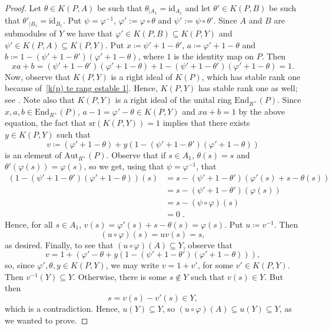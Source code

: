 \documentclass[11pt]{amsart}
\numberwithin{equation}{section}
\theoremstyle{definition}
\theoremstyle{plain}
\theoremstyle{definition}
\begin{document}
\begin{proof}
Let $\theta \in K(P, A)$ be such that $\theta_{|A_1} = \mathrm{id}_{A_1}$ and let $\theta' \in K(P, B)$ be such that $\theta'_{|B_1} = \mathrm{id}_{B_1}$. Put $\psi = \varphi^{-1}$, $\varphi' := \varphi \circ \theta$ and $\psi' := \psi \circ \theta'$. Since $A$ and $B$ are submodules of $Y$ we have that $\varphi' \in K(P, B) \subseteq K(P,Y)$ and $\psi' \in K(P, A) \subseteq K(P,Y)$. Put $x \coloneqq \psi' + 1 - \theta'$, $a \coloneqq \varphi' + 1 - \theta$ and $b \coloneqq 1 - (\psi' + 1 - \theta')(\varphi' + 1 - \theta)$, where $1$ is the identity map on $P$. Then   
\begin{equation*}
    xa + b = (\psi' + 1 - \theta')(\varphi' + 1 - \theta) + 1 - (\psi' + 1 - \theta')(\varphi' + 1 - \theta) = 1.
\end{equation*}
Now, observe that $K(P, Y)$ is a right ideal of $K(P)$, which has stable rank one because of~\autoref{k(p) te rang estable 1}. Hence, $K(P, Y)$ has stable rank one as well; see \cite[Theorem 3.6]{Vaserstein84StRangeCond}. 
Note also that $K(P,Y)$ is a right ideal of the unital ring $\mathrm{End}_{R^+}(P)$.
Since $x, a, b \in \mathrm{End}_{R^+}(P)$, $a - 1 = \varphi' - \theta \in K(P, Y)$ and $xa + b = 1$ by the above equation, the fact that $\mathrm{sr}(K(P, Y)) = 1$ implies that there exists $y \in K(P, Y)$ such that 
\begin{equation*}
    v \coloneqq (\varphi' + 1 - \theta) + y(1 - (\psi' + 1 - \theta')(\varphi' + 1 - \theta)) 
\end{equation*}
is an element of $\mathrm{Aut}_{R^+}(P)$. Observe that if $s \in A_1$, $\theta(s) = s$ and $\theta'(\varphi(s)) = \varphi(s)$, so we get, using that $\psi=\varphi^{-1}$, that
\begin{align*}
    (1 - (\psi' + 1 - \theta')(\varphi' + 1 - \theta))(s) & = s - (\psi' + 1 - \theta')(\varphi'(s) + s - \theta(s)) \\
    & = s - (\psi' + 1 - \theta')(\varphi(s)) \\
    & = s - (\psi \circ \varphi)(s) \\
    & = 0\; . 
\end{align*}
Hence, for all $s \in A_1$, $v(s) =\varphi'(s) + s - \theta(s) = \varphi(s)$. Put $u \coloneqq v^{-1}$. Then 
\begin{equation*}
    (u \circ \varphi)(s) = uv(s) = s,
\end{equation*}
as desired. Finally, to see that $(u \circ \varphi)(A) \subseteq Y$, observe that 
\begin{equation*}
    v = 1 + (\varphi' - \theta + y(1 - (\psi' + 1 - \theta')(\varphi' + 1 - \theta))),
\end{equation*}
so, since $\varphi', \theta, y \in K(P,Y)$, we may write $v = 1 + v'$, for some $v' \in K(P, Y)$. Then $v^{-1}(Y) \subseteq Y$. Otherwise, there is some $s \notin Y$ such that $v(s) \in Y$. But then
\begin{equation*}
    s = v(s) - v'(s) \in Y, 
\end{equation*}
which is a contradiction. Hence, $u(Y) \subseteq Y$, so $(u \circ \varphi)(A) \subseteq u(Y) \subseteq Y$, as we wanted to prove. 
\end{proof}
\end{document}
